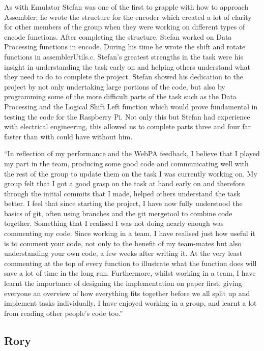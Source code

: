 \documentclass[a4wide, 10pt]{article}
\begin{document}
As with Emulator Stefan was one of the first to grapple with how to approach Assembler; he wrote the structure for the encoder which created a lot of clarity for other members of the group when they were working on different types of encode functions. After completing the structure, Stefan worked on Data Processing functions in encode. During his time he wrote the shift and rotate functions in assemblerUtils.c. Stefan's greatest strengths in the task were his insight in understanding the task early on and helping others understand what they need to do to complete the project. Stefan showed his dedication to the project by not only undertaking large portions of the code, but also by programming some of the more difficult parts of the task such as the Data Processing and the Logical Shift Left function which would prove fundamental in testing the code for the Raspberry Pi. Not only this but Stefan had experience with electrical engineering, this allowed us to complete parts three and four far faster than with could have without him.

\textquotedblleft In reflection of my performance and the WebPA feedback, I believe that I played my part in the team, producing some good code and communicating well with the rest of the group to update them on the task I was currently working on. My group felt that I got a good grasp on the task at hand early on and therefore through the initial commits that I made, helped others understand the task better. I feel that since starting the project, I have now fully understood the basics of git, often using branches and the git mergetool to combine code together. Something that I realised I was not doing nearly enough was commenting my code. Since working in a team, I have realised just how useful it is to comment your code, not only to the benefit of my team-mates but also understanding your own code, a few weeks after writing it. At the very least commenting at the top of every function to illustrate what the function does will save a lot of time in the long run. Furthermore, whilst working in a team, I have learnt the importance of designing the implementation on paper first, giving everyone an overview of how everything fits together before we all split up and implement tasks individually. I have enjoyed working in a group, and learnt a lot from reading other people's code too.\textquotedblright

\subsection*{Rory}
\end{document}
